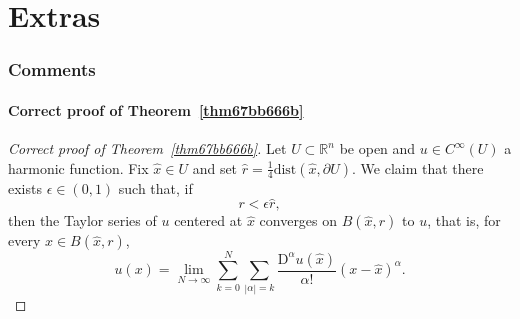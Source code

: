 \documentclass[a4paper,9pt]{amsart}
\newcommand{\R}{\mathbb{R}}	%
\newcommand{\de}{\partial}		%
\newcommand{\Diff}{\mathrm{D}}
\newcommand{\dist}{\mathrm{dist}}
\theoremstyle{plain}
\theoremstyle{definition}
\theoremstyle{remark}
\begin{document}
\part{Extras}

\section{Comments}

\subsection{Correct proof of Theorem~\ref{thm67bb666b}}\label{subs688c7a1a}
\begin{proof}[Correct proof of Theorem~\ref{thm67bb666b}]
	Let $U\subset\R^n$ be open and $u\in C^\infty(U)$ a harmonic function.
	Fix $\hat x\in U$ and set $\hat r = \frac14 \dist(\hat x,\de U)$.
	We claim that there exists $\epsilon\in(0,1)$ such that, if
	\begin{equation}\label{eq67bb678e}
		r < %
		\epsilon \hat r,
	\end{equation}
	then the Taylor series of $u$ centered at $\hat x$ converges on $B(\hat x,r)$ to $u$,
	that is, for every $x\in B(\hat x,r)$,
	\begin{equation}\label{eq67bb6792}
		u(x) = \lim_{N\to\infty} \sum_{k=0}^N \sum_{|\alpha|=k} \frac{\Diff^\alpha u(\hat x)}{\alpha!} (x-\hat x)^\alpha .
	\end{equation}
	

\end{proof}
\end{document}
